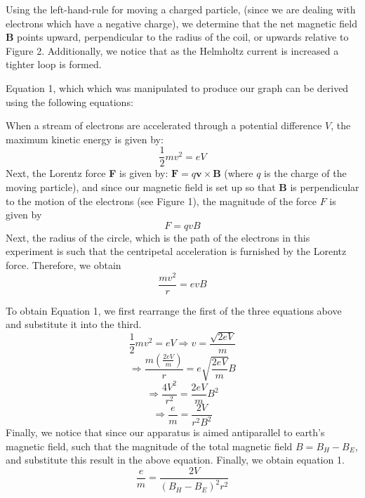 \documentclass[letterpaper]{article}
\begin{document}

Using the left-hand-rule for moving a charged particle, (since we are
dealing with electrons which have a negative charge), we determine that the net magnetic field \textbf{B}
points upward, perpendicular to the radius of the coil, or upwards relative to Figure 2. Additionally, we notice that
as the Helmholtz current is increased a tighter loop is formed.

Equation 1, which which was manipulated to produce our graph can be derived using the following equations:

\noindent When a stream of electrons are accelerated through a potential difference $V$, the maximum
kinetic energy is given by:
$$\frac{1}{2}mv^2 = eV$$
Next, the Lorentz force \textbf{F} is given by:
$\textbf{F}=q\textbf{v}\times \textbf{B}$
(where $q$ is the charge of the moving particle), and since our magnetic field is set up so that \textbf{B} is perpendicular to the motion of the electrons (see Figure 1),
the magnitude of the force $F$ is given by $$F=qvB$$
Next, the radius of the circle, which is the path of the electrons in this experiment is such that
the centripetal acceleration is furnished by the Lorentz force. Therefore, we obtain $$\frac{mv^2}{r}=evB$$

\noindent To obtain Equation 1, we first rearrange the first of the three equations above and substitute it into the third.
$$\frac{1}{2}mv^2 = eV \Rightarrow v=\frac{\sqrt{2eV}}{m}$$
$$\Rightarrow \frac{m(\frac{2eV}{m})}{r}=e\sqrt{\frac{2eV}{m}}B$$
$$\Rightarrow \frac{4V^2}{r^2}=\frac{2eV}{m}B^2$$
$$\Rightarrow \frac{e}{m} = \frac{2V}{r^2B^2}$$
Finally, we notice that since our apparatus is aimed antiparallel to earth's magnetic field, such that
the magnitude of the total magnetic field $B=B_H-B_E$, and substitute this result in the above equation.
Finally, we obtain equation 1.
$$\frac{e}{m} = \frac{2V}{(B_H-B_E)^2r^2}$$
\end{document}
